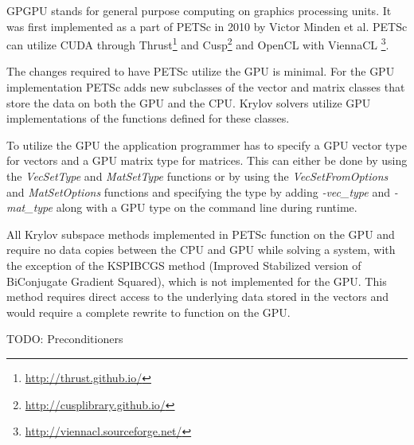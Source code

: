 GPGPU stands for general purpose computing on graphics processing units. It was 
first implemented as a part of PETSc in 2010\cite{minden2010preliminary} by Victor 
Minden et al. PETSc can utilize CUDA through Thrust\footnote{\url{http://thrust.github.io/}} 
and Cusp\footnote{\url{http://cusplibrary.github.io/}} and OpenCL with ViennaCL
\footnote{\url{http://viennacl.sourceforge.net/}}. 

The changes required to have PETSc utilize the GPU is minimal. For the GPU 
implementation PETSc adds new subclasses of the vector and matrix classes that 
store the data on both the GPU and the CPU. Krylov solvers utilize GPU implementations 
of the functions defined for these classes.

To utilize the GPU the application programmer has to specify a GPU vector type 
for vectors and a GPU matrix type for matrices. This can either be done by using 
the \emph{VecSetType} and \emph{MatSetType} functions or by using the \emph{VecSetFromOptions}
and \emph{MatSetOptions} functions and specifying the type by adding \emph{-vec\_type} and 
\emph{-mat\_type} along with a GPU type on the command line during runtime. 

All Krylov subspace methods implemented in PETSc function on the GPU and require 
no data copies between the CPU and GPU while solving a system, with the exception
of the KSPIBCGS method (Improved Stabilized version of BiConjugate Gradient Squared),
which is not implemented for the GPU. This method requires direct access to the 
underlying data stored in the vectors and would require a complete rewrite to 
function on the GPU.

TODO: Preconditioners